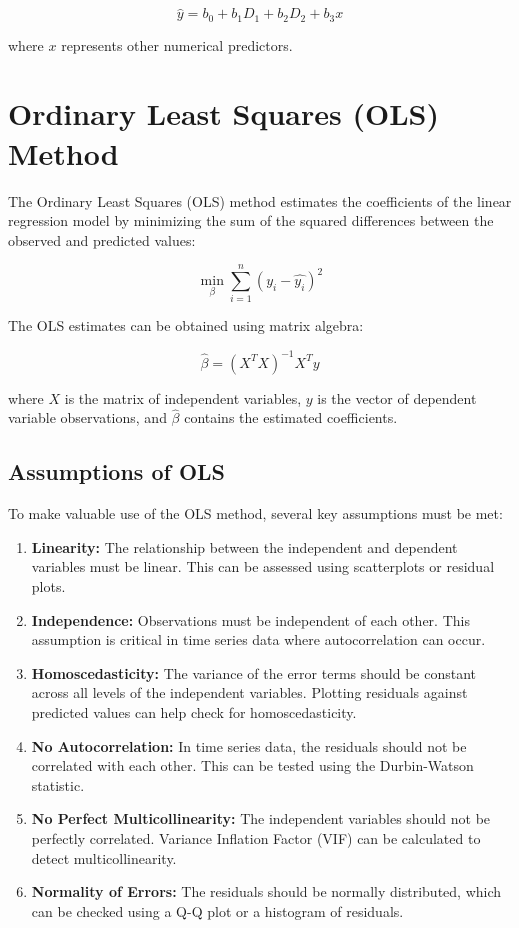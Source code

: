 \documentclass{article}
\begin{document}
\[
\hat{y} = b_0 + b_1 D_1 + b_2 D_2 + b_3 x
\]

where \(x\) represents other numerical predictors.

\newpage
\section{Ordinary Least Squares (OLS) Method}

The Ordinary Least Squares (OLS) method estimates the coefficients of the linear regression model by minimizing the sum of the squared differences between the observed and predicted values:

\[
\min_{\beta} \sum_{i=1}^{n} (y_i - \hat{y_i})^2
\]

The OLS estimates can be obtained using matrix algebra:

\[
\hat{\beta} = (X^TX)^{-1}X^Ty
\]

where \(X\) is the matrix of independent variables, \(y\) is the vector of dependent variable observations, and \(\hat{\beta}\) contains the estimated coefficients.

\newpage
\subsection{Assumptions of OLS}

To make valuable use of the OLS method, several key assumptions must be met:

\begin{enumerate}
    \item \textbf{Linearity:} The relationship between the independent and dependent variables must be linear. This can be assessed using scatterplots or residual plots.
    
    \item \textbf{Independence:} Observations must be independent of each other. This assumption is critical in time series data where autocorrelation can occur.
    
    \item \textbf{Homoscedasticity:} The variance of the error terms should be constant across all levels of the independent variables. Plotting residuals against predicted values can help check for homoscedasticity.
    
    \item \textbf{No Autocorrelation:} In time series data, the residuals should not be correlated with each other. This can be tested using the Durbin-Watson statistic.
    
    \item \textbf{No Perfect Multicollinearity:} The independent variables should not be perfectly correlated. Variance Inflation Factor (VIF) can be calculated to detect multicollinearity.
    
    \item \textbf{Normality of Errors:} The residuals should be normally distributed, which can be checked using a Q-Q plot or a histogram of residuals.
\end{enumerate}
\end{document}
